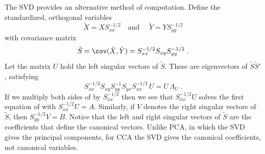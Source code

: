 \documentclass[12pt]{article}
\begin{document}
 The SVD provides an alternative method of computation. Define the standardized,
 orthogonal variables
 \begin{displaymath}
   \tilde{X} = X S_{xx}^{-1/2} \quad \mbox{and }  \quad
   \tilde{Y} = Y S_{yy}^{-1/2} 
 \end{displaymath}
 with covariance matrix
 \begin{displaymath}
   \tilde{S} =
     \cov(\tilde{X},\tilde{Y}) = S_{xx}^{-1/2} S_{xy} S_{yy}^{-1/2} \;.   
 \end{displaymath}
 Let the matrix $U$ hold the left singular vectors of $\tilde{S}$.  These are
 eigenvectors of $\tilde{S} \tilde{S}'$, satisfying
 \begin{equation}
    S_{xx}^{-1/2} S_{xy} S_{yy}^{-1} S_{yx} S_{xx}^{-1/2} \, U = U \, \Lambda_U \;.
 \label{eq:appS}
 \end{equation}
 If we multiply both sides of  by $S_{xx}^{-1/2}$ then we see that
 $S_{xx}^{-1/2}U$ solves the first equation of  with $S_{xx}^{-1/2}U = A$.
  Similarly, if $V$ denotes the right singular vectors of $\tilde{S}$, then
 $S_{yy}^{-1/2}V = B$.  Notice that the left and right singular vectors of
 $\tilde{S}$ are the coefficients that define the canonical vectors.  Unlike PCA,
 in which the SVD gives the principal components, for CCA the SVD gives the
 canonical coefficients, not canonical variables.




\end{document}

